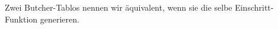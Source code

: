 \begin{definition*}

Zwei Butcher-Tablos nennen wir äquivalent, wenn sie die selbe Einschritt-Funktion generieren.

\end{definition*}
